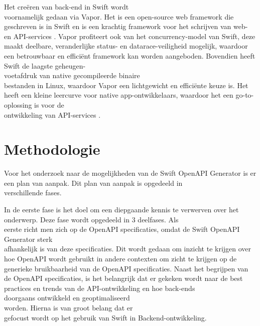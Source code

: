 Het creëren van back-end in Swift wordt \\voornamelijk gedaan via Vapor. Het is een open-source web framework die geschreven is in Swift en is een krachtig framework voor het schrijven van web- en API-services \autocite{Nelson}. Vapor profiteert ook van het concurrency-model van Swift, deze maakt deelbare, veranderlijke status- en datarace-veiligheid mogelijk, waardoor een betrouwbaar en efficiënt framework kan worden aangeboden. Bovendien heeft Swift de laagste geheugen-\\voetafdruk van native gecompileerde binaire \\bestanden in Linux, waardoor Vapor een lichtgewicht en efficiënte keuze is. Het heeft een kleine leercurve voor native app-ontwikkelaars, waardoor het een go-to-oplossing is voor de \\ontwikkeling van API-services \autocite{Pant2023}.



\section{Methodologie}%
\label{sec:methodologie}

Voor het onderzoek naar de mogelijkheden van de Swift OpenAPI Generator is er een plan van aanpak. Dit plan van aanpak is opgedeeld in \\verschillende fases. 

In de eerste fase is het doel om een diepgaande kennis te verwerven over het onderwerp. Deze fase wordt opgedeeld in 3 deelfases. Als \\eerste richt men zich op de OpenAPI specificaties, omdat de Swift OpenAPI Generator sterk \\afhankelijk is van deze specificaties. Dit wordt gedaan om inzicht te krijgen over hoe OpenAPI wordt gebruikt in andere contexten om zicht te krijgen op de generieke bruikbaarheid van de OpenAPI specificaties. Naast het begrijpen van de OpenAPI specificaties, is het belangrijk dat er gekeken wordt naar de best practices en trends van de API-ontwikkeling en hoe back-ends \\doorgaans ontwikkeld en geoptimaliseerd \\worden. Hierna is van groot belang dat er \\gefocust wordt op het gebruik van Swift in Backend-ontwikkeling. 

